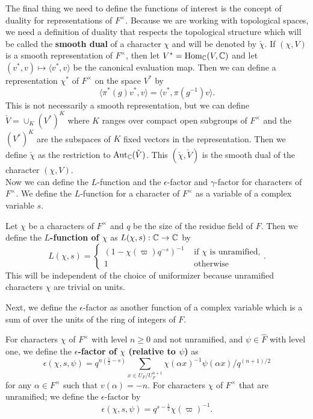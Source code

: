 The final thing we need to define the functions of interest is the concept of duality for representations of $F^\times$.
Because we are working with topological spaces, we need a definition of duality that respects the topological structure which will be called the \textbf{smooth dual} of a character $\chi$ and will be denoted by $\check{\chi}$.
If $(\chi, V)$ is a smooth representation of $F^\times$, then let $V^* = \textrm{Hom}_{\mathbb{C}}(V,\mathbb{C})$ and let $(v^* , v) \mapsto \langle v^*, v\rangle$ be the canonical evaluation map.
Then we can define a representation $\chi^*$ of $F^\times$ on the space $V^*$ by
\[\langle \pi^*(g)v^*, v\rangle = \langle v^* , \pi(g^{-1})v\rangle.\]
This is not necessarily a smooth representation, but we can define $\check{V} = \cup_K (V^*)^K$ where $K$ ranges over compact open subgroups of $F^\times$ and the $(V^*)^K$ are the subspaces of $K$ fixed vectors in the representation.
Then we define $\check{\chi}$ as the restriction to $\textrm{Aut}_{\mathbb{C}}(\check{V})$.
This $(\check{\chi},\check{V})$ is the smooth dual of the character $(\chi, V)$.
\\

Now we can define the $L$-function and the  $\epsilon$-factor and $\gamma$-factor for characters of $F^\times$.
We define the $L$-function for a character of $F^\times$ as a variable of a complex variable $s$.

\begin{defn}
  Let $\chi$ be a characters of $F^\times$ and $q$ be the size of the residue field of $F$. Then we define the \textbf{$L$-function of $\chi$} as $L(\chi, s) : \mathbb{C} \to \mathbb{C}$ by 
  \[L(\chi, s) = \begin{cases} (1 - \chi(\varpi) q^{-s})^{-1} & \text{ if } \chi \text{ is unramified,} \\ 1 & \text{ otherwise} \end{cases}.\]
  This will be independent of the choice of uniformizer because unramified characters $\chi$ are trivial on units.
\end{defn}

Next, we define the $\epsilon$-factor as another function of a complex variable which is a sum of over the units of the ring of integers of $F$.
\begin{defn}
  For characters $\chi$ of $F^\times$ with level $n \geq 0$ and not unramified, and $\psi \in \hat{F}$ with level one, we define the \textbf{$\epsilon$-factor of $\chi$ (relative to $\psi$)} as
  \[\epsilon(\chi, s, \psi) = q^{n(\frac{1}{2} - s)} \sum_{x \in U_F/U_F^{n+1}} \chi(\alpha x)^{-1} \psi(\alpha x)/q^{(n+1)/2}\]
  for any $\alpha \in F^\times$ such that $v(\alpha) = -n$.
  For characters $\chi$ of $F^\times$ that are unramified; we define the $\epsilon$-factor by
  \[\epsilon(\chi, s, \psi) = q^{s - \frac{1}{2}} \chi(\varpi)^{-1}.\]
\end{defn}


